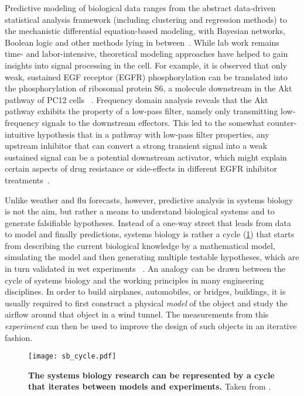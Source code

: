 Predictive modeling of biological data ranges from the 
abstract 
data-driven statistical analysis framework (including clustering and 
regression methods) to the mechanistic differential 
equation-based modeling, with Bayesian networks, Boolean
logic and other methods lying in between~\citep{deJong2002}. 
While lab work remains time- and labor-intensive, 
theoretical 
modeling approaches have helped to gain insights into 
signal processing in the cell.
For example, it is observed that only
weak, sustained EGF receptor (EGFR) phosphorylation can be
translated into the phosphorylation of ribosomal protein 
S6, a molecule downstream in the Akt pathway of PC12 cells~%
\citep{Fujita2010}. Frequency domain analysis reveals that 
the Akt pathway exhibits the property of a low-pass filter,
namely only transmitting low-frequency signals to the 
downstream effectors. This led to the somewhat 
counter-intuitive hypothesis that in a pathway with low-pass filter properties, any upstream inhibitor that can convert a strong transient signal into a weak sustained signal can be a potential downstream activator, which might 
explain certain aspects of drug resistance or side-effects
in different EGFR inhibitor treatments~\citep{Kosaka2011,
Lin2012}.

Unlike weather and flu forecasts, however, predictive
analysis in systems biology is not the aim, 
but rather a means to understand 
biological systems and to generate falsifiable hypotheses. 
Instead of a one-way street that leads
from data to model and finally predictions, systems biology
is rather a cycle (\ref{fig:sb_cycle}) 
that starts from describing the current
biological knowledge by a mathematical model, simulating
the model and then generating multiple testable hypotheses, which
are in turn validated in wet experiments~%
\citep{Kitano2002e}. An analogy can be drawn between the
cycle of systems biology and the working principles in many
engineering disciplines. In order to build airplanes, 
automobiles, or bridges, buildings, it is usually required
to first construct a physical \emph{model} of the object
and study the airflow around that object in a wind tunnel.
The measurements from this \emph{experiment} can then be 
used to improve the design of such objects in an iterative
fashion.

\begin{figure}[!ht]
\begin{center}
\texttt{[image: sb\_cycle.pdf]}
\end{center}
\caption[Cycle of systems biology]{{\bf The systems biology
research can be represented by a cycle that iterates between
models and experiments.} 
Taken from \cite{Kitano2002e}.
}
\label{fig:sb_cycle}
\end{figure}


